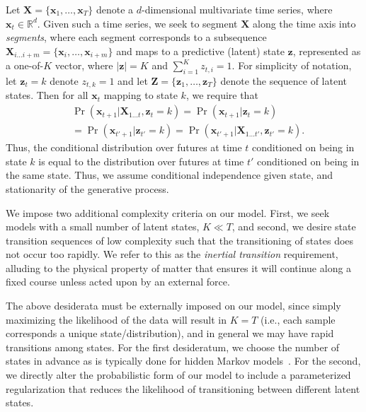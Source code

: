 \documentclass[letterpaper]{article}
\begin{document}
Let $\mathbf{X} = \{\mathbf{x}_1, \ldots, \mathbf{x}_T\}$ denote a
$d$-dimensional multivariate time series, where $\mathbf{x}_t \in \mathbb{R}^d$.
Given such a time series, we seek to segment $\mathbf{X}$ along the time axis
into \emph{segments}, where each segment corresponds to a subsequence
$\mathbf{X}_{i\ldots i+m} = \{\mathbf{x}_i, \ldots, \mathbf{x}_{i+m}\}$ and maps
to a predictive (latent) state $\mathbf{z}$, represented as a one-of-$K$ vector,
where $|\mathbf{z}| = K$ and $\sum_{i=1}^{K}z_{t,i} = 1$. For simplicity of
notation, let $\mathbf{z}_{t} = k$ denote $z_{t,k} = 1$ and let $\mathbf{Z} =
\{\mathbf{z}_1, \ldots, \mathbf{z}_T\}$ denote the sequence of latent states.
Then for all $\mathbf{x}_{t}$ mapping to state $k$, we require that
\begin{align*}
    &\Pr(\mathbf{x}_{t+1}|\mathbf{X}_{1\ldots t}, \mathbf{z}_t = k) =
    \Pr(\mathbf{x}_{t+1}| \mathbf{z}_t = k) \\
    &= \Pr(\mathbf{x}_{t'+1}| \mathbf{z}_{t'} = k) 
    = \Pr(\mathbf{x}_{t'+1}| \mathbf{X}_{1\ldots t'}, \mathbf{z}_{t'} = k).
\end{align*}
Thus, the conditional distribution over futures at time $t$ conditioned on being
in state $k$ is equal to the distribution over futures at time $t'$ conditioned
on being in the same state. Thus, we assume conditional independence given
state, and stationarity of the generative process.

We impose two additional complexity criteria on our model. First, we seek models
with a small number of latent states, $K \ll T$, and second, we desire state
transition sequences of low complexity such that the transitioning of states
does not occur too rapidly. We refer to this as the \emph{inertial transition}
requirement, alluding to the physical property of matter that ensures it will
continue along a fixed course unless acted upon by an external force.

The above desiderata must be externally imposed on our model, since simply
maximizing the likelihood of the data will result in $K = T$ (i.e., each sample
corresponds a unique state/distribution), and in general we may have rapid
transitions among states. For the first desideratum,  we choose the number of
states in advance as is typically done for hidden Markov
models~\cite{rabiner1989tutorial}. For the second, we directly alter the
probabilistic form of our model to include a parameterized regularization that
reduces the likelihood of transitioning between different latent states.
% 
\end{document}
